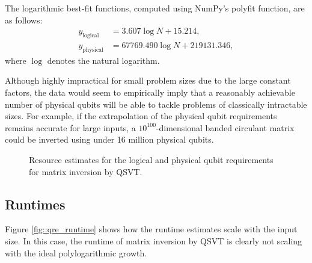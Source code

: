 \documentclass[10pt, twocolumn]{article}
\begin{document}
The logarithmic best-fit functions, computed using NumPy's polyfit function, are as follows:
\begin{align*}
	y_\text{logical} &= 3.607 \log{N} + 15.214, \\
	y_\text{physical} &= 67769.490 \log{N} + 219131.346,
\end{align*}
where $\log$ denotes the natural logarithm.

Although highly impractical for small problem sizes due to the large constant factors, the data would seem to empirically imply that a reasonably achievable number of physical qubits will be able to tackle problems of classically intractable sizes. For example, if the extrapolation of the physical qubit requirements remains accurate for large inputs, a $10^{100}$-dimensional banded circulant matrix could be inverted using under 16 million physical qubits.

\begin{figure}
	\centering
	\caption{Resource estimates for the logical and physical qubit requirements for matrix inversion by QSVT.}
	\label{fig::qre_qubits}
\end{figure}

\subsection{Runtimes}

Figure \ref{fig::qre_runtime} shows how the runtime estimates scale with the input size. In this case, the runtime of matrix inversion by QSVT is clearly not scaling with the ideal polylogarithmic growth.
\end{document}
